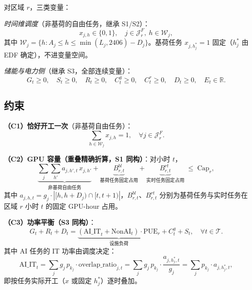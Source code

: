 \documentclass{internal-report}
\begin{document}
对区域 $r$，三类变量：

\emph{时间维调度}（非基荷的自由任务，继承 S1/S2）：
\begin{equation}
  x_{j,h} \in \{0,1\},\quad j \in \mathcal{J}^{F}_r,\ h \in \mathcal{W}_j,
\end{equation}
其中 $\mathcal{W}_j=\{h: A_j\le h\le \min(L_j,2406)-D_j\}$。基荷任务 $x_{j,h_j^*}=1$ 固定（$h_j^*$ 由 EDF 确定），不进变量空间。

\emph{储能与电力侧}（继承 S3，全部连续变量）：
\begin{equation}
  G_t \ge 0,\quad S_t \ge 0,\quad R_t \ge 0,\quad C^g_t \ge 0,\quad C^r_t \ge 0,\quad D_t \ge 0,\quad E_t \in \mathbb{R}.
  \label{eq:var}
\end{equation}

\subsection{约束}

\textbf{（C1）恰好开工一次}（非基荷自由任务）：
\begin{equation}
  \sum_{h\in\mathcal{W}_j} x_{j,h} = 1,\quad \forall j \in \mathcal{J}^{F}_r.
  \label{eq:c1}
\end{equation}

\textbf{（C2）GPU 容量（重叠精确折算，S1 同构）}：对小时 $t$，
\begin{equation}
  \underbrace{\sum_{j}\sum_{h'} a_{j,h',t}\, x_{j,h'}}_{\text{非基荷自由任务}}
  + \underbrace{B^{bl}_{r,t}}_{\text{基荷任务固定占用}}
  + \underbrace{B^{rt}_{r,t}}_{\text{实时任务固定占用}}
  \;\le\; \text{Cap}_r,
  \label{eq:c2}
\end{equation}
其中 $a_{j,h,t}=g_j\cdot|[h,h+D_j)\cap[t,t+1)|$，$B^{bl}_{r,t}$、$B^{rt}_{r,t}$ 分别为基荷任务与实时任务在区域 $r$ 小时 $t$ 的固定 GPU-hour 占用。

\textbf{（C3）功率平衡（S3 同构）}：
\begin{equation}
  G_t + R_t + D_t = \underbrace{(\text{AI\_IT}_t + \text{NonAI}_t) \cdot \text{PUE}_r}_{\text{设施负荷}}
  + C^g_t + S_t,\quad \forall t\in\mathcal{T}.
  \label{eq:c3}
\end{equation}
其中 AI 任务的 IT 功率由调度决定：
\begin{equation}
  \text{AI\_IT}_t = \sum_j g_j\, p_{k_j} \cdot \text{overlap\_ratio}_{j,t}
  = \sum_j g_j\, p_{k_j} \cdot \frac{a_{j,h_j^*,t}}{g_j}
  = \sum_j p_{k_j} \cdot a_{j,h_j^*,t},
  \label{eq:aiit}
\end{equation}
即按任务实际开工（$x$ 或固定 $h_j^*$）逐时叠加。
\end{document}
